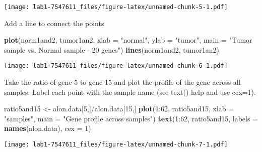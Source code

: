\documentclass[]{article}
\newenvironment{Shaded}{\begin{snugshade}}{\end{snugshade}}
\newcommand{\KeywordTok}[1]{\textcolor[rgb]{0.13,0.29,0.53}{\textbf{{#1}}}}
\newcommand{\DataTypeTok}[1]{\textcolor[rgb]{0.13,0.29,0.53}{{#1}}}
\newcommand{\DecValTok}[1]{\textcolor[rgb]{0.00,0.00,0.81}{{#1}}}
\newcommand{\StringTok}[1]{\textcolor[rgb]{0.31,0.60,0.02}{{#1}}}
\newcommand{\NormalTok}[1]{{#1}}
\begin{document}
\texttt{[image: lab1-7547611\_files/figure-latex/unnamed-chunk-5-1.pdf]}

Add a line to connect the points

\begin{Shaded}
\begin{Highlighting}[]
\KeywordTok{plot}\NormalTok{(norm1and2, tumor1an2, }\DataTypeTok{xlab =} \StringTok{"normal"}\NormalTok{, }\DataTypeTok{ylab =} \StringTok{"tumor"}\NormalTok{,}
     \DataTypeTok{main =} \StringTok{"Tumor sample vs. Normal sample - 20 genes"}\NormalTok{)}
\KeywordTok{lines}\NormalTok{(norm1and2, tumor1an2)}
\end{Highlighting}
\end{Shaded}

\texttt{[image: lab1-7547611\_files/figure-latex/unnamed-chunk-6-1.pdf]}

Take the ratio of gene 5 to gene 15 and plot the profile of the gene
across all samples. Label each point with the sample name (see text()
help and use cex=1).

\begin{Shaded}
\begin{Highlighting}[]
\NormalTok{ratio5and15 <-}\StringTok{ }\NormalTok{alon.data[}\DecValTok{5}\NormalTok{,]/alon.data[}\DecValTok{15}\NormalTok{,]}
\KeywordTok{plot}\NormalTok{(}\DecValTok{1}\NormalTok{:}\DecValTok{62}\NormalTok{, ratio5and15, }\DataTypeTok{xlab =} \StringTok{"samples"}\NormalTok{, }\DataTypeTok{main =} \StringTok{"Gene profile across samples"}\NormalTok{)}
\KeywordTok{text}\NormalTok{(}\DecValTok{1}\NormalTok{:}\DecValTok{62}\NormalTok{, ratio5and15, }\DataTypeTok{labels =} \KeywordTok{names}\NormalTok{(alon.data), }\DataTypeTok{cex =} \DecValTok{1}\NormalTok{)}
\end{Highlighting}
\end{Shaded}

\texttt{[image: lab1-7547611\_files/figure-latex/unnamed-chunk-7-1.pdf]}
\end{document}
